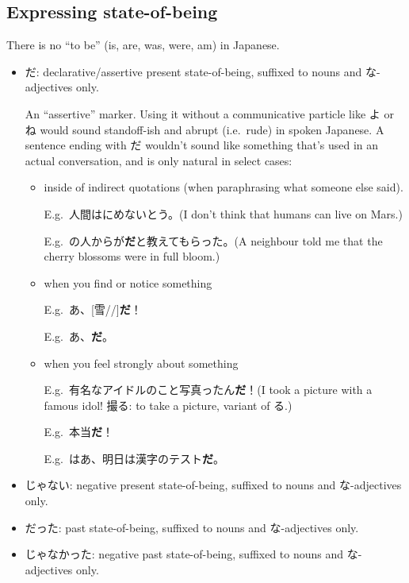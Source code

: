 \documentclass[../nihongo-gakushuu-kyouzai.tex]{subfiles}
\begin{document}
\subsection{Expressing state-of-being}
There is no ``to be'' (is, are, was, were, am) in Japanese.
\begin{itemize}
    \item だ: declarative/assertive present state-of-being, suffixed to nouns and な-adjectives only.

    An ``assertive'' marker. Using it without a communicative particle like よ or ね would sound standoff-ish and abrupt (i.e.\ rude) in spoken Japanese. A sentence ending with だ wouldn't sound like something that's used in an actual conversation, and is only natural in select cases:
    \begin{itemize}
        \item inside of indirect quotations (when paraphrasing what someone else said).

        E.g.\ 人間はにめないとう。(I don't think that humans can live on Mars.)

        E.g.\ の人からが\textbf{だ}と教えてもらった。(A neighbour told me that the cherry blossoms were in full bloom.)
        \item when you find or notice something

        E.g.\ あ、[雪//]\textbf{だ}！

        E.g.\ あ、\textbf{だ}。

        \item when you feel strongly about something

        E.g.\ 有名なアイドルのこと写真ったん\textbf{だ}！(I took a picture with a famous idol! 撮る: to take a picture, variant of る.)

        E.g.\ 本当\textbf{だ}！

        E.g.\ はあ、明日は漢字のテスト\textbf{だ}。
    \end{itemize}


    \item じゃない: negative present state-of-being, suffixed to nouns and な-adjectives only.


    \item だった: past state-of-being, suffixed to nouns and な-adjectives only.
    \item じゃなかった: negative past state-of-being, suffixed to nouns and な-adjectives only.

\end{itemize}
\end{document}
